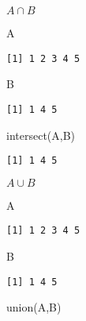 \documentclass[
  letterpaper,
  DIV=11,
  numbers=noendperiod]{scrreprt}
\newenvironment{Shaded}{\begin{snugshade}}{\end{snugshade}}
\newcommand{\FunctionTok}[1]{\textcolor[rgb]{0.28,0.35,0.67}{#1}}
\newcommand{\NormalTok}[1]{\textcolor[rgb]{0.00,0.23,0.31}{#1}}
\begin{document}
\(A\cap B\)

\begin{Shaded}
\begin{Highlighting}[]
\NormalTok{A}
\end{Highlighting}
\end{Shaded}

\begin{verbatim}
[1] 1 2 3 4 5
\end{verbatim}

\begin{Shaded}
\begin{Highlighting}[]
\NormalTok{B}
\end{Highlighting}
\end{Shaded}

\begin{verbatim}
[1] 1 4 5
\end{verbatim}

\begin{Shaded}
\begin{Highlighting}[]
\FunctionTok{intersect}\NormalTok{(A,B)}
\end{Highlighting}
\end{Shaded}

\begin{verbatim}
[1] 1 4 5
\end{verbatim}

\(A\cup B\)

\begin{Shaded}
\begin{Highlighting}[]
\NormalTok{A}
\end{Highlighting}
\end{Shaded}

\begin{verbatim}
[1] 1 2 3 4 5
\end{verbatim}

\begin{Shaded}
\begin{Highlighting}[]
\NormalTok{B}
\end{Highlighting}
\end{Shaded}

\begin{verbatim}
[1] 1 4 5
\end{verbatim}

\begin{Shaded}
\begin{Highlighting}[]
\FunctionTok{union}\NormalTok{(A,B)}
\end{Highlighting}
\end{Shaded}
\end{document}
